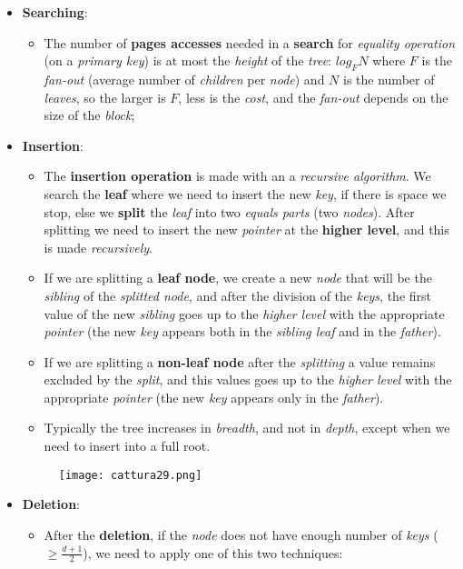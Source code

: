 \documentclass{article}
\begin{document}
\begin{itemize}
\item \textbf{Searching}:
\begin{itemize}
\item The number of \textbf{pages accesses} needed in a \textbf{search} for \emph{equality operation} (on a \emph{primary key}) is at most the \emph{height} of the \emph{tree}: $log_FN$ where $F$ is the \emph{fan-out} (average number of \emph{children} per \emph{node}) and $N$ is the number of \emph{leaves}, so the larger is $F$, less is the \emph{cost}, and the \emph{fan-out} depends on the size of the \emph{block};
\end{itemize}
\item \textbf{Insertion}:
\begin{itemize}
\item The \textbf{insertion operation} is made with an a \emph{recursive algorithm}. We search the \textbf{leaf} where we need to insert the new \emph{key}, if there is space we stop, else we \textbf{split} the \emph{leaf} into two \emph{equals parts} (two \emph{nodes}). After splitting we need to insert the new \emph{pointer} at the \textbf{higher level}, and this is made \emph{recursively}.
\item If we are splitting a \textbf{leaf node}, we create a new \emph{node} that will be the \emph{sibling} of the \emph{splitted node}, and after the division of the \emph{keys}, the first value of the new \emph{sibling} goes up to the \emph{higher level} with the appropriate \emph{pointer} (the new \emph{key} appears both in the \emph{sibling leaf} and in the \emph{father}). 
\item If we are splitting a \textbf{non-leaf node} after the \emph{splitting} a value remains excluded by the \emph{split}, and this values goes up to the \emph{higher level} with the appropriate \emph{pointer} (the new \emph{key} appears only in the \emph{father}). 
\item Typically the tree increases in \emph{breadth}, and not in \emph{depth}, except when we need to insert into a full root. 
\end{itemize}
\begin{figure}[H]
  \centering
  \texttt{[image: cattura29.png]}
\end{figure} 
\item \textbf{Deletion}:
\begin{itemize}
\item After the \textbf{deletion}, if the \emph{node} does not have enough number of \emph{keys} ($ \geq \frac{d+1}{2}$), we need to apply one of this two techniques: 

\end{itemize}
\end{itemize}
\end{document}
